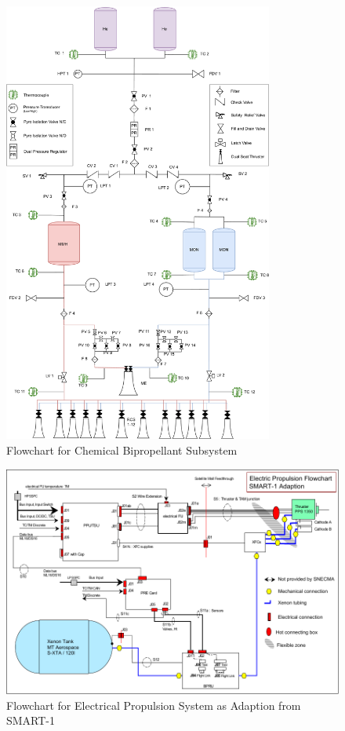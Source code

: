 \begin{figure}[h]
  \centering
  \includegraphics[width=0.79\textwidth]{pdf/Flowchart_Biprop.pdf}
  \caption{Flowchart for Chemical Bipropellant Subsystem}
  \label{fig:flow-biprop}
\end{figure}


\begin{figure}[h]
  \includegraphics[width=\textwidth]{img/electric_flowchart.pdf}
  \caption{Flowchart for Electrical Propulsion System as Adaption from SMART-1 \cite{Koppel2004}}
  \label{fig:flow-elec}
\end{figure}

